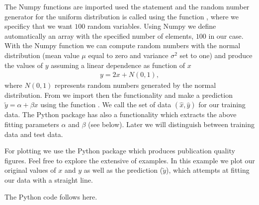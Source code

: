 \documentclass[letterpaper,10pt,english]{sphinxmanual}
\begin{document}
The Numpy functions are imported used the 
statement and the random number generator for the uniform distribution
is called using the function , where we specificy
that we want \(100\) random variables.  Using Numpy we define
automatically an array with the specified number of elements, \(100\) in
our case.  With the Numpy function  we can compute random
numbers with the normal distribution (mean value \(\mu\) equal to zero and
variance \(\sigma^2\) set to one) and produce the values of \(y\) assuming a linear
dependence as function of \(x\)
\begin{equation*}
\begin{split}
y = 2x+N(0,1),
\end{split}
\end{equation*}
where \(N(0,1)\) represents random numbers generated by the normal
distribution.  From  we import then the
 functionality and make a prediction \(\tilde{y} =
\alpha + \beta x\) using the function . We call the set of
data \((\hat{x},\hat{y})\) for our training data. The Python package
 has also a functionality which extracts the above
fitting parameters \(\alpha\) and \(\beta\) (see below). Later we will
distinguish between training data and test data.

For plotting we use the Python package
 which produces publication
quality figures. Feel free to explore the extensive
 of examples. In
this example we plot our original values of \(x\) and \(y\) as well as the
prediction  (\(\tilde{y}\)), which attempts at fitting our
data with a straight line.

The Python code follows here.
\end{document}
